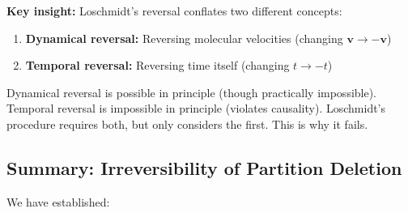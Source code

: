 \documentclass[twocolumn,10pt]{article}
\theoremstyle{definition}
\theoremstyle{remark}
\begin{document}
\noindent\textbf{Key insight:} Loschmidt's reversal conflates two different concepts:
\begin{enumerate}
\item \textbf{Dynamical reversal:} Reversing molecular velocities (changing $\mathbf{v} \to -\mathbf{v}$)
\item \textbf{Temporal reversal:} Reversing time itself (changing $t \to -t$)
\end{enumerate}

\noindent Dynamical reversal is possible in principle (though practically impossible). Temporal reversal is impossible in principle (violates causality). Loschmidt's procedure requires both, but only considers the first. This is why it fails.

\subsection{Summary: Irreversibility of Partition Deletion}

We have established:
\end{document}

